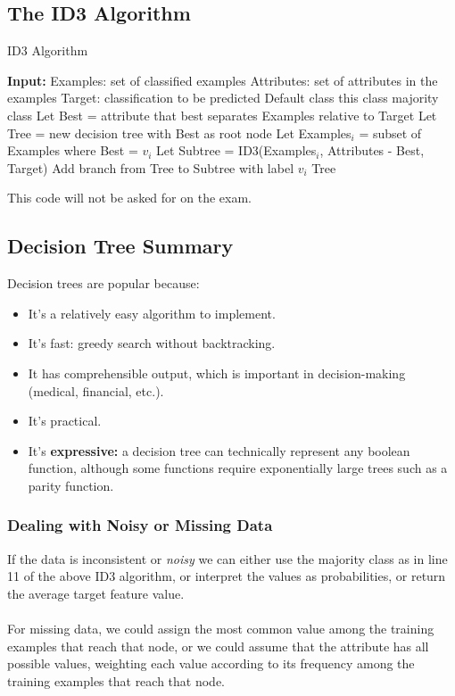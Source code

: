 \documentclass[a4paper,11pt]{article}
\begin{document}
\subsection{The ID3 Algorithm}
\begin{algorithm}[H]
\caption{ID3 Algorithm}
\begin{algorithmic}[1]
    \State \textbf{Input:} 
    \State \quad Examples: set of classified examples
    \State \quad Attributes: set of attributes in the examples
    \State \quad Target: classification to be predicted
        \State \Return Default class
        \State \Return this class
        \State \Return majority class
    \Else
        \State Let Best = attribute that best separates Examples relative to Target
        \State Let Tree = new decision tree with Best as root node
            \State Let Examples$_i$ = subset of Examples where Best = $v_i$
            \State Let Subtree = ID3(Examples$_i$, Attributes - Best, Target)
            \State Add branch from Tree to Subtree with label $v_i$
        \EndFor
        \State \Return Tree
    \EndIf
\EndProcedure
\end{algorithmic}
\end{algorithm}

This code will not be asked for on the exam.

\subsection{Decision Tree Summary}
Decision trees are popular because:
\begin{itemize}
    \item   It's a relatively easy algorithm to implement.
    \item   It's fast: greedy search without backtracking.
    \item   It has comprehensible output, which is important in decision-making (medical, financial, etc.).
    \item   It's practical.
    \item   It's \textbf{expressive:} a decision tree can technically represent any boolean function, although some functions require exponentially large trees such as a parity function.
\end{itemize}

\subsubsection{Dealing with Noisy or Missing Data}
If the data is inconsistent or \textit{noisy} we can either use the majority class as in line 11 of the above ID3 algorithm, or interpret the values as probabilities, or return the average target feature value.
\\\\
For missing data, we could assign the most common value among the training examples that reach that node, or we could assume that the attribute has all possible values, weighting each value according to its frequency among the training examples that reach that node.
\end{document}
